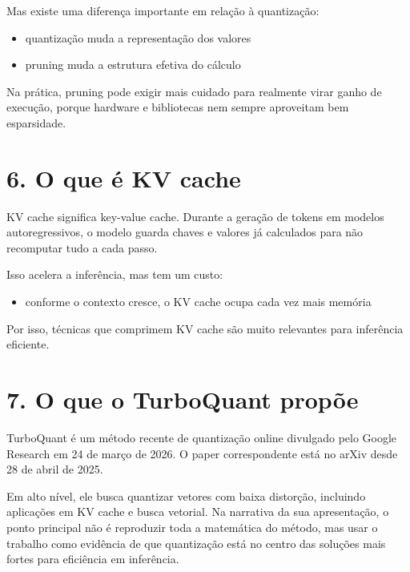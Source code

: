 Mas existe uma diferença importante em relação à quantização:

\begin{itemize}
\item quantização muda a representação dos valores
\item pruning muda a estrutura efetiva do cálculo
\end{itemize}


Na prática, pruning pode exigir mais cuidado para realmente virar ganho de execução, porque hardware e bibliotecas nem sempre aproveitam bem esparsidade.



\section{6. O que é KV cache}




KV cache significa key-value cache. Durante a geração de tokens em modelos autoregressivos, o modelo guarda chaves e valores já calculados para não recomputar tudo a cada passo.



Isso acelera a inferência, mas tem um custo:

\begin{itemize}
\item conforme o contexto cresce, o KV cache ocupa cada vez mais memória
\end{itemize}


Por isso, técnicas que comprimem KV cache são muito relevantes para inferência eficiente.



\section{7. O que o TurboQuant propõe}




TurboQuant é um método recente de quantização online divulgado pelo Google Research em 24 de março de 2026. O paper correspondente está no arXiv desde 28 de abril de 2025.




Em alto nível, ele busca quantizar vetores com baixa distorção, incluindo aplicações em KV cache e busca vetorial. Na narrativa da sua apresentação, o ponto principal não é reproduzir toda a matemática do método, mas usar o trabalho como evidência de que quantização está no centro das soluções mais fortes para eficiência em inferência.




